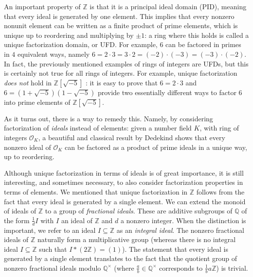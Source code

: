 \documentclass[a4paper,USenglish,cleveref, autoref, thm-restate]{lipics-v2021}
\newcommand*{\OK}[1][K]{\mathcal{O}_{#1}}
\newcommand{\Q}{\mathbb{Q}}
\newcommand{\Z}{\mathbb{Z}}
\begin{document}
An important property of $\Z$ is that it is a principal ideal domain (PID), meaning that every ideal is generated by one element. This implies that every nonzero nonunit element can be written as a %
finite product of prime elements, which is unique up to reordering and multiplying by $\pm 1$: a ring where this holds is called a unique factorization domain, or UFD. %
For example, $6$ can be factored in primes in $4$ equivalent ways, namely $6=2\cdot 3=3\cdot2=(-2)\cdot (-3)=(-3) \cdot (-2)$.
In fact, the previously mentioned examples of rings of integers are UFDs, but this is certainly not true for all rings of integers. For example, unique factorization \emph{does not} hold in $\Z[\sqrt{-5}]$%
: it is easy to prove that $6=2\cdot3$ and $6=(1+\sqrt{-5}) (1-\sqrt{-5})$ provide two essentially different ways to factor $6$ into prime elements of $\Z[\sqrt{-5}]$.

As it turns out, there is a way to remedy this. Namely, by considering factorization of \emph{ideals} instead of elements: given a number field $K$, with ring of integers $\OK$, a beautiful and classical result by Dedekind shows that every nonzero ideal of $\OK$ can be factored as a product of prime ideals in a unique way, up to reordering.

Although unique factorization in terms of ideals is of great importance, it is still interesting, and sometimes %
necessary, to also consider factorization properties in terms of elements.
We mentioned that unique factorization in $\Z$ follows from the fact that every ideal is generated by a single element.
We can extend the monoid of ideals of $\Z$ to a group of \emph{fractional ideals}.
These are additive subgroups of $\Q$ of the form $\frac{1}{d} I$ with $I$ an ideal of $\Z$ and $d$ a nonzero integer.
When the distinction is important, we refer to an ideal $I \subseteq \Z$ as an \emph{integral ideal}.
The nonzero fractional ideals of $\Z$ naturally form a multiplicative group (whereas there is no integral ideal $I\subseteq \Z$ such that $I*(2\Z)=(1)$).
The statement that every ideal is generated by a single element
translates to the fact that the quotient group of nonzero fractional ideals modulo $\Q^\times$ (where $\frac{a}{b} \in \Q^\times$ corresponds to $\frac{1}{b} a \Z$) is trivial.
\end{document}
